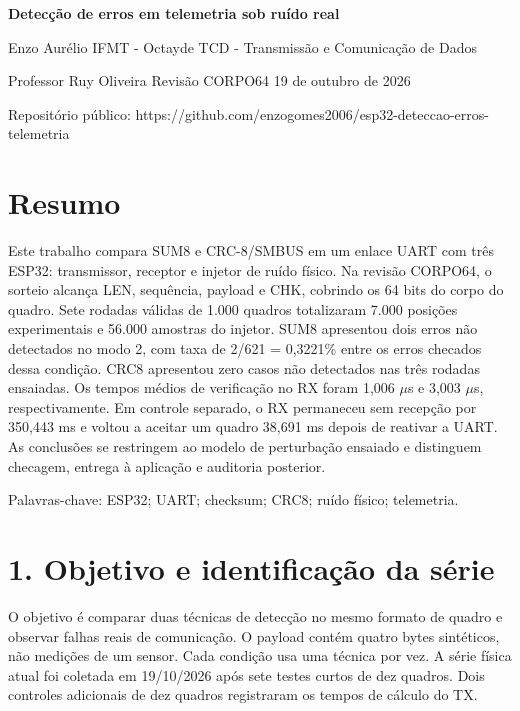 \documentclass[11pt,a4paper]{article}
\begin{document}
\begin{center}{\LARGE\bfseries Detecção de erros em telemetria sob ruído real}\end{center}

Enzo Aurélio \textperiodcentered{} IFMT - Octayde \textperiodcentered{} TCD - Transmissão e Comunicação de Dados


Professor Ruy Oliveira \textperiodcentered{} Revisão CORPO64 \textperiodcentered{} 19 de outubro de 2026


Repositório público: https://github.com/enzogomes2006/esp32-deteccao-erros-telemetria


\section*{Resumo}

Este trabalho compara SUM8 e CRC-8/SMBUS em um enlace UART com três ESP32: transmissor, receptor e injetor de ruído físico. Na revisão CORPO64, o sorteio alcança LEN, sequência, payload e CHK, cobrindo os 64 bits do corpo do quadro. Sete rodadas válidas de 1.000 quadros totalizaram 7.000 posições experimentais e 56.000 amostras do injetor. SUM8 apresentou dois erros não detectados no modo 2, com taxa de 2/621 = 0,3221\% entre os erros checados dessa condição. CRC8 apresentou zero casos não detectados nas três rodadas ensaiadas. Os tempos médios de verificação no RX foram 1,006 \ensuremath{\mu}s e 3,003 \ensuremath{\mu}s, respectivamente. Em controle separado, o RX permaneceu sem recepção por 350,443 ms e voltou a aceitar um quadro 38,691 ms depois de reativar a UART. As conclusões se restringem ao modelo de perturbação ensaiado e distinguem checagem, entrega à aplicação e auditoria posterior.


Palavras-chave: ESP32; UART; checksum; CRC8; ruído físico; telemetria.


\section*{1. Objetivo e identificação da série}

O objetivo é comparar duas técnicas de detecção no mesmo formato de quadro e observar falhas reais de comunicação. O payload contém quatro bytes sintéticos, não medições de um sensor. Cada condição usa uma técnica por vez. A série física atual foi coletada em 19/10/2026 após sete testes curtos de dez quadros. Dois controles adicionais de dez quadros registraram os tempos de cálculo do TX.
\end{document}
